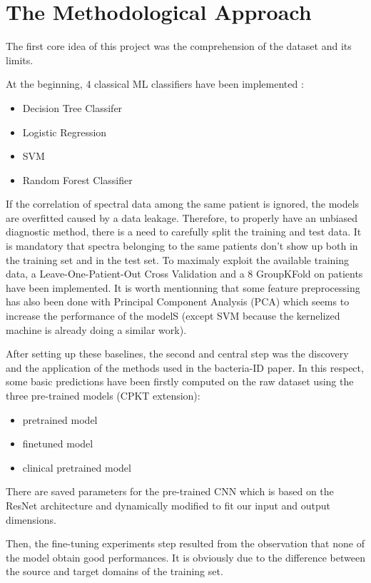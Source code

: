 \section{The Methodological Approach}

The first core idea of this project was the comprehension of the dataset and its limits. 

At the beginning, 4 classical ML classifiers have been implemented :
\begin{itemize}
\item Decision Tree Classifer
\item Logistic Regression 
\item SVM
\item Random Forest Classifier
\end{itemize}

If the correlation of spectral data among the same patient is ignored, the models are overfitted caused by a data leakage.
Therefore, to properly have an unbiased diagnostic method, there is a need to carefully split the training and test data. It is mandatory that spectra belonging to the same patients don't show up both in the training set and in the test set.
To maximaly exploit the available training data, a Leave-One-Patient-Out Cross Validation and a 8 GroupKFold on patients have been implemented. 
It is worth mentionning that some feature preprocessing has also been done with Principal Component Analysis (PCA) which seems to increase the performance of the modelS (except SVM because the kernelized machine is already doing a similar work).

After setting up these baselines, the second and central step was the discovery and the application of the methods used in the bacteria-ID paper. In this respect, some basic predictions have been firstly computed on the raw dataset using the three pre-trained models (CPKT extension): 
\begin{itemize}
\item pretrained model 
\item finetuned model 
\item clinical pretrained model
\end{itemize}
There are saved parameters for the pre-trained CNN which is based on the ResNet architecture and dynamically modified to fit our input and output dimensions.

Then, the fine-tuning experiments step resulted from the observation that none of the model obtain good performances. It is obviously due to the difference between the source and target domains of the training set.

